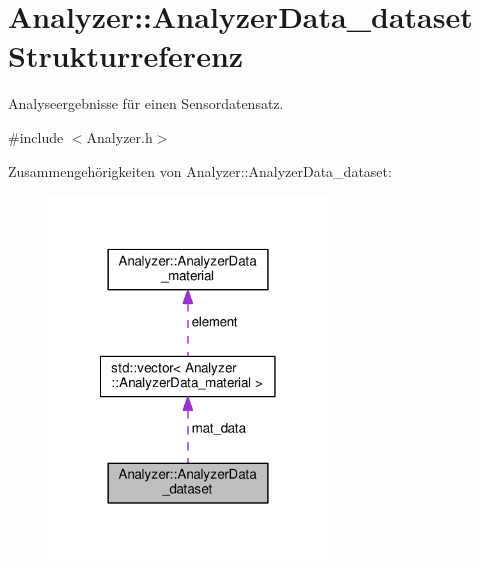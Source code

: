 \hypertarget{structAnalyzer_1_1AnalyzerData__dataset}{\section{Analyzer\-:\-:Analyzer\-Data\-\_\-dataset Strukturreferenz}
\label{structAnalyzer_1_1AnalyzerData__dataset}
}


Analyseergebnisse für einen Sensordatensatz.  




{\ttfamily \#include $<$Analyzer.\-h$>$}



Zusammengehörigkeiten von Analyzer\-:\-:Analyzer\-Data\-\_\-dataset\-:
\nopagebreak
\begin{figure}[H]
\begin{center}
\leavevmode
\includegraphics[width=210pt]{structAnalyzer_1_1AnalyzerData__dataset__coll__graph}
\end{center}
\end{figure}
